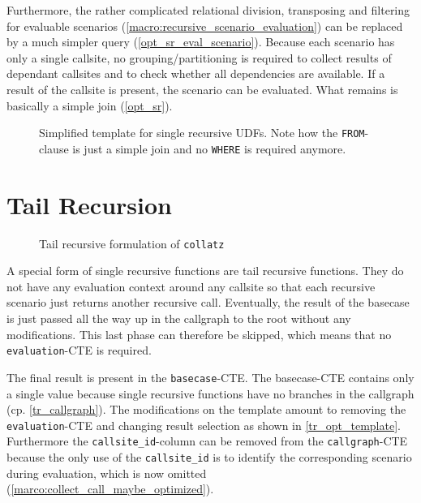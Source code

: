 Furthermore, the rather complicated relational division, transposing and filtering for evaluable scenarios (\autoref{macro:recursive_scenario_evaluation}) can be replaced by a much simpler query (\autoref{opt_sr_eval_scenario}). Because each scenario has only a single callsite, no grouping/partitioning is required to collect results of dependant callsites and to check whether all dependencies are available. If a result of the callsite is present, the scenario can be evaluated. What remains is basically a simple join (\autoref{opt_sr}).

\begin{figure}[h!]
    \centering
    \caption{Simplified template for single recursive UDFs. Note how the \texttt{FROM}-clause is just a simple join and no \texttt{WHERE} is required anymore.}
    \label{opt_sr_eval_scenario}
\end{figure}



\section{Tail Recursion}

\begin{wrapfigure}{r}{0.5\textwidth}
  \vspace{-10pt}
  \caption{Tail recursive formulation of \texttt{collatz}}
  \label{lst:fib_tr}
\end{wrapfigure}

A special form of single recursive functions are tail recursive functions. They do not have any evaluation context around any callsite so that each recursive scenario just returns another recursive call. Eventually, the result of the basecase is just passed all the way up in the callgraph to the root without any modifications. This last phase can therefore be skipped, which means that no \texttt{evaluation}-CTE is required.

The final result is present in the \texttt{basecase}-CTE. The basecase-CTE contains only a single value because single recursive functions have no branches in the callgraph (cp. \autoref{tr_callgraph}). The modifications on the template amount to removing the \texttt{evaluation}-CTE and changing result selection as shown in \autoref{tr_opt_template}. Furthermore the \texttt{callsite\_id}-column can be removed from the \texttt{callgraph}-CTE because the only use of the \texttt{callsite\_id} is to identify the corresponding scenario during evaluation, which is now omitted (\autoref{marco:collect_call_maybe_optimized}).

